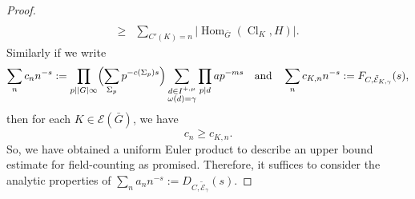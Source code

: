 \documentclass{amsart}
\numberwithin{equation}{section}
\theoremstyle{plain}
\theoremstyle{definition}
\theoremstyle{remark}
\begin{document}
\begin{proof}
\begin{equation*}
\begin{aligned}
			\\
			\geq&\sum_{C'(K)=n}\lvert\operatorname{Hom}_{\bar{G}}(\operatorname{Cl}_K,H)\rvert.
		\end{aligned}
	\end{equation*}
	Similarly if we write
	\begin{equation*}
		\sum_n c_nn^{-s}:=
		\prod_{p\mid\lvert G\rvert\infty}\Bigl(\sum_{\Sigma_p}p^{-c(\Sigma_p)s}\Bigr)
		\sum_{
			\substack{
				d\in I^{+,\mu}\\
				\omega(d)=\gamma
			}
		}
		\prod_{p\mid d}ap^{-ms}
		\quad\text{and}\quad
		\sum_n c_{K,n}n^{-s}:=F_{C,\tilde{\mathcal{E}}_{K,\gamma}}(s),
	\end{equation*}
	then for each $K\in\mathcal{E}(\bar{G})$, we have
	\begin{equation*}
		c_n\geq c_{K,n}.
	\end{equation*}
	So, we have obtained a uniform Euler product to describe an upper bound estimate for field-counting as promised.
	Therefore, it suffices to consider the analytic properties of $\sum_n a_nn^{-s}:=D_{C,\tilde{\mathcal{E}}_{\gamma}}(s)$.
	

\end{proof}
\end{document}
